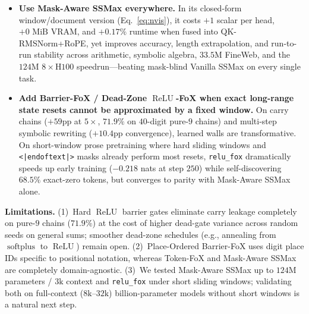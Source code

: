 \documentclass[10pt]{article}
\begin{document}
\begin{itemize}
  \item \textbf{Use Mask-Aware SSMax everywhere.} In its closed-form window/document version (Eq.~\ref{eq:nvis}), it costs $+1$ scalar per head, $+0\text{ MiB}$ VRAM, and $+0.17\%$ runtime when fused into QK-RMSNorm+RoPE, yet improves accuracy, length extrapolation, and run-to-run stability across arithmetic, symbolic algebra, $33.5\text{M}$ FineWeb, and the $124\text{M}$ $8\times\text{H100}$ speedrun---beating mask-blind Vanilla SSMax on every single task.
  \item \textbf{Add Barrier-FoX / Dead-Zone $\operatorname{ReLU}$-FoX when exact long-range state resets cannot be approximated by a fixed window.} On carry chains ($+59\text{pp}$ at $5\times$, $71.9\%$ on $40$-digit pure-$9$ chains) and multi-step symbolic rewriting ($+10.4\text{pp}$ convergence), learned walls are transformative. On short-window prose pretraining where hard sliding windows and \texttt{<|endoftext|>} masks already perform most resets, \texttt{relu\_fox} dramatically speeds up early training ($-0.218$ nats at step $250$) while self-discovering $68.5\%$ exact-zero tokens, but converges to parity with Mask-Aware SSMax alone.
\end{itemize}

\textbf{Limitations.}
(1)~Hard $\operatorname{ReLU}$ barrier gates eliminate carry leakage completely on pure-$9$ chains ($71.9\%$) at the cost of higher dead-gate variance across random seeds on general sums; smoother dead-zone schedules (e.g., annealing from $\operatorname{softplus}$ to $\operatorname{ReLU}$) remain open.
(2)~Place-Ordered Barrier-FoX uses digit place IDs specific to positional notation, whereas Token-FoX and Mask-Aware SSMax are completely domain-agnostic.
(3)~We tested Mask-Aware SSMax up to $124\text{M}$ parameters / $3\text{k}$ context and \texttt{relu\_fox} under short sliding windows; validating both on full-context ($8\text{k--}32\text{k}$) billion-parameter models without short windows is a natural next step.
\end{document}

